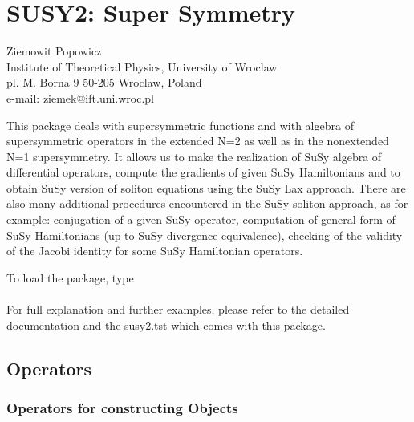 \documentclass[11pt,letterpaper]{book}
\makeatletter
\newcommand{\underscore}{\_}
\newcommand{\ttindex}[1]{{\renewcommand{\_}{\protect\underscore}%
                          \index{#1@{\tt #1}}}}
\makeatother
\begin{document}
\chapter{SUSY2: Super Symmetry}
\label{SUSY2}

{\footnotesize
\begin{center}
Ziemowit Popowicz \\
Institute of Theoretical Physics, University of Wroclaw\\
pl. M. Borna 9 50-205 Wroclaw, Poland \\
e-mail: ziemek@ift.uni.wroc.pl
\end{center}
}
\ttindex{SUSY2}


This package deals with supersymmetric functions and with algebra
of supersymmetric operators in the extended N=2 as well as in the
nonextended N=1 supersymmetry. It allows us
to make the realization of SuSy algebra of differential operators,
compute the gradients of given SuSy Hamiltonians and to obtain
SuSy version of soliton equations using the SuSy Lax approach. There
are also many additional procedures encountered in the SuSy soliton
approach, as for example: conjugation of a given SuSy operator, computation
of general form of SuSy Hamiltonians (up to SuSy-divergence equivalence),
checking of the validity of the Jacobi identity for some SuSy
Hamiltonian operators.

To load the package, type  \\
\\
For full explanation and further examples, please refer to the
detailed documentation and the susy2.tst which comes with this package.

\section{Operators}

\subsection{Operators for constructing Objects}
\end{document}
